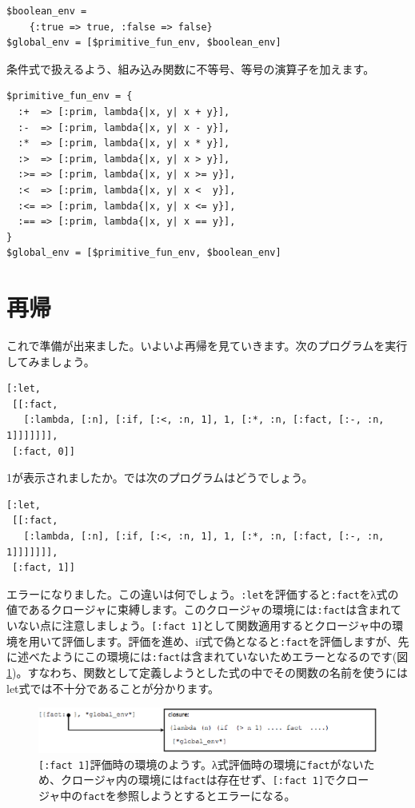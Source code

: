 \begin{lstlisting}
$boolean_env = 
    {:true => true, :false => false}
$global_env = [$primitive_fun_env, $boolean_env]
\end{lstlisting}

条件式で扱えるよう、組み込み関数に不等号、等号の演算子を加えます。

\begin{lstlisting}
$primitive_fun_env = {
  :+  => [:prim, lambda{|x, y| x + y}],
  :-  => [:prim, lambda{|x, y| x - y}],
  :*  => [:prim, lambda{|x, y| x * y}],
  :>  => [:prim, lambda{|x, y| x > y}],
  :>= => [:prim, lambda{|x, y| x >= y}],
  :<  => [:prim, lambda{|x, y| x <  y}],
  :<= => [:prim, lambda{|x, y| x <= y}],
  :== => [:prim, lambda{|x, y| x == y}],
}
$global_env = [$primitive_fun_env, $boolean_env]
\end{lstlisting}

\section{再帰}

これで準備が出来ました。いよいよ再帰を見ていきます。次のプログラムを実行してみましょう。

\begin{lstlisting}
[:let, 
 [[:fact,
   [:lambda, [:n], [:if, [:<, :n, 1], 1, [:*, :n, [:fact, [:-, :n, 1]]]]]]], 
 [:fact, 0]]
\end{lstlisting}

1が表示されましたか。では次のプログラムはどうでしょう。

\begin{lstlisting}
[:let, 
 [[:fact,
   [:lambda, [:n], [:if, [:<, :n, 1], 1, [:*, :n, [:fact, [:-, :n, 1]]]]]]], 
 [:fact, 1]]
\end{lstlisting}

エラーになりました。この違いは何でしょう。{\tt :let}を評価すると{\tt :fact}をλ式の値であるクロージャに束縛します。このクロージャの環境には{\tt :fact}は含まれていない点に注意しましょう。{\tt [:fact 1]}として関数適用するとクロージャ中の環境を用いて評価します。評価を進め、if式で偽となると{\tt :fact}を評価しますが、先に述べたようにこの環境には{\tt :fact}は含まれていないためエラーとなるのです(図\ref{fig:let})。すなわち、関数として定義しようとした式の中でその関数の名前を使うにはlet式では不十分であることが分かります。

\begin{figure}[htbp]
\begin{center}
\includegraphics[width=140mm]{images/let.eps}
\end{center}
\caption{{\tt [:fact 1]}評価時の環境のようす。λ式評価時の環境に{\tt fact}がないため、クロージャ内の環境には{\tt fact}は存在せず、{\tt [:fact 1]}でクロージャ中の{\tt fact}を参照しようとするとエラーになる。}
\label{fig:let}
\end{figure}

